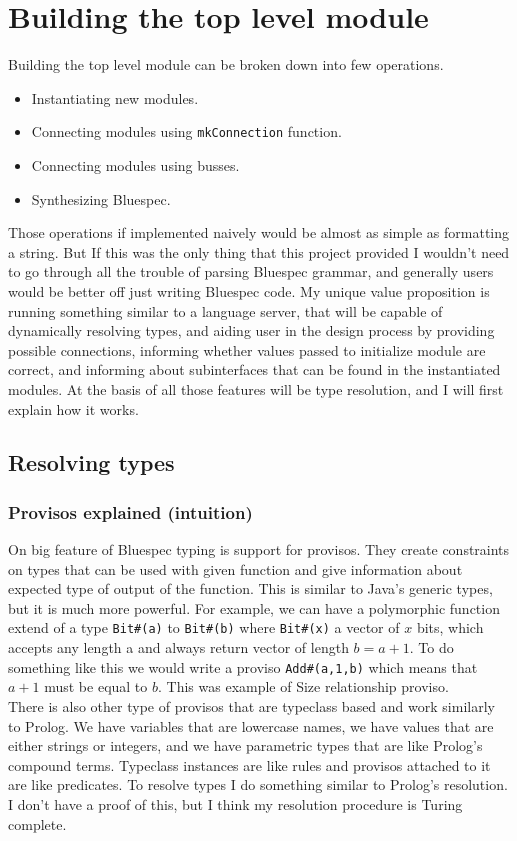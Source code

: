 \documentclass[14pt]{report}
\begin{document}
\section{Building the top level module}
Building the top level module can be broken down into few operations.
\begin{itemize}
    \item Instantiating new modules.
    \item Connecting modules using \verb!mkConnection! function.
    \item Connecting modules using busses.
    \item Synthesizing Bluespec.
\end{itemize} 
Those operations if implemented naively would be almost as simple as formatting a string. But If this was the only thing that this project provided I wouldn't need to go through all the trouble of parsing Bluespec grammar, and generally users would be better off just writing Bluespec code. My unique value proposition is running something similar to a language server, that will be capable of dynamically resolving types, and aiding user in the design process by providing possible connections, informing whether values passed to initialize module are correct, and informing about subinterfaces that can be found in the instantiated modules. 
At the basis of all those features will be type resolution, and I will first explain how it works.
\subsection{Resolving types}
\subsubsection{Provisos explained (intuition)}
On big feature of Bluespec typing is support for provisos. They create constraints on types that can be used with given function and give information about expected type of output of the function. This is similar to Java's generic types, but it is much more powerful. For example, we can have a polymorphic function extend of a type \verb!Bit#(a)! to \verb!Bit#(b)! where \verb!Bit#(x)! a vector of $x$ bits, which accepts any length a and always return vector of length $b=a+1$. To do something like this we would write a proviso \verb!Add#(a,1,b)! which means that $a+1$ must be equal to $b$. This was example of Size relationship proviso.
\\
There is also other type of provisos that are typeclass based and work similarly to Prolog. We have variables that are lowercase names, we have values that are either strings or integers, and we have parametric types that are like Prolog's compound terms. Typeclass instances are like rules and provisos attached to it are like predicates. To resolve types I do something similar to Prolog's resolution. I don't have a proof of this, but I think my resolution procedure is Turing complete.
\end{document}
